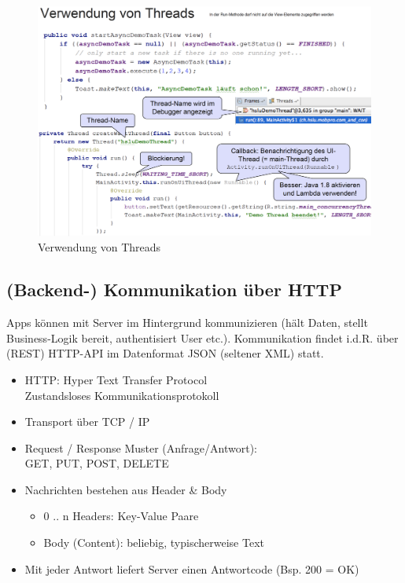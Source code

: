 \documentclass[a4paper]{article}
\begin{document}
		\begin{figure}[htb!]
			\centering
			\includegraphics[width=.9\textwidth]{img/threads_usage.png}
			\caption{Verwendung von Threads}
		\end{figure}
	
	
	\subsection{(Backend-) Kommunikation über HTTP}
	
		Apps können mit Server im Hintergrund kommunizieren (hält Daten, stellt Business-Logik bereit, authentisiert User etc.).
		Kommunikation findet i.d.R. über (REST) HTTP-API im Datenformat JSON (seltener XML) statt.
		
		\begin{itemize}
			\item HTTP: Hyper Text Transfer Protocol \\
					Zustandsloses Kommunikationsprotokoll
				
			\item Transport über TCP / IP
			\item Request / Response Muster (Anfrage/Antwort): \\
					GET, PUT, POST, DELETE
					
			\item Nachrichten bestehen aus Header \& Body
			\begin{itemize}
				\item 0 .. n Headers: Key-Value Paare
				
				\item Body (Content): beliebig, typischerweise Text
			\end{itemize}
			
			\item Mit jeder Antwort liefert Server einen Antwortcode (Bsp. 200 = OK)
			
		\end{itemize}
	
\end{document}
